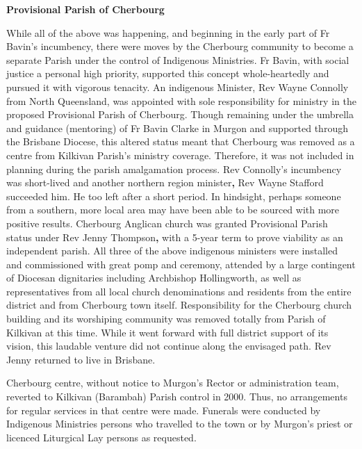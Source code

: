 \textbf{Provisional Parish of Cherbourg}

While all of the above was happening, and beginning in the early part of Fr Bavin's incumbency, there were moves by the Cherbourg community to become a separate Parish under the control of Indigenous Ministries. Fr Bavin, with social justice a personal high priority, supported this concept whole-heartedly and pursued it with vigorous tenacity. An indigenous Minister, Rev Wayne Connolly from North Queensland, was appointed with sole responsibility for ministry in the proposed Provisional Parish of Cherbourg. Though remaining under the umbrella and guidance (mentoring) of Fr Bavin Clarke in Murgon and supported through the Brisbane Diocese, this altered status meant that Cherbourg was removed as a centre from Kilkivan Parish's ministry coverage. Therefore, it was not included in planning during the parish amalgamation process. Rev Connolly's incumbency was short-lived and another northern region minister\textbf{,} Rev Wayne Stafford succeeded him. He too left after a short period. In hindsight, perhaps someone from a southern, more local area may have been able to be sourced with more positive results. Cherbourg Anglican church was granted Provisional Parish status under Rev Jenny Thompson\textbf{,} with a 5-year term to prove viability as an independent parish. All three of the above indigenous ministers were installed and commissioned with great pomp and ceremony, attended by a large contingent of Diocesan dignitaries including Archbishop Hollingworth, as well as representatives from all local church denominations and residents from the entire district and from Cherbourg town itself. Responsibility for the Cherbourg church building and its worshiping community was removed totally from Parish of Kilkivan at this time. While it went forward with full district support of its vision, this laudable venture did not continue along the envisaged path. Rev Jenny returned to live in Brisbane.

Cherbourg centre, without notice to Murgon's Rector or administration team, reverted to Kilkivan (Barambah) Parish control in 2000. Thus, no arrangements for regular services in that centre were made. Funerals were conducted by Indigenous Ministries persons who travelled to the town or by Murgon's priest or licenced Liturgical Lay persons as requested.

